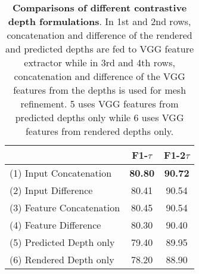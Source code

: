 \begin{table}[ht]
\begin{center}
\footnotesize
\begin{tabular}{ l c c }
\toprule[1pt]
 &F1-$\tau$ &F1-2$\tau$ \\ \hline
(1) Input Concatenation \qquad \qquad  \qquad  \qquad  \qquad  & \textbf{80.80} & \textbf{90.72} \\
(2) Input Difference & 80.41 & 90.54 \\
(3) Feature Concatenation   & 80.45 & 90.54 \\
(4) Feature Difference & 80.30 & 90.40 \\
(5) Predicted Depth only & 79.40 & 89.95 \\
(6) Rendered Depth only & 78.20 & 88.90 \\
\bottomrule[1pt]
\end{tabular}
\end{center}
\vspace{-4mm}
\caption{\textbf{Comparisons of different contrastive depth formulations}. In 1st and 2nd rows, concatenation and difference of the rendered and predicted depths are fed to VGG feature extractor while in 3rd and 4th rows, concatenation and difference of the VGG features from the depths is used for mesh refinement. 5 uses VGG features from predicted depths only while 6 uses VGG features from rendered depths only. }
\label{table:contrastive_feature_extraction}
\end{table}


